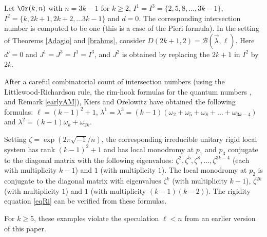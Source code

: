 Let  $\Gr(k,n)$ with $n=3k-1$ for $k\ge2$, $I^1=I^3=\{2,5,8,\dots,3k-1\}$, $I^2=\{k,2k+1,2k+2,\dots 3k-1\}$ and $d=0$. The corresponding intersection number is computed to be one (this is a case of the Pieri formula).  In the setting of Theorems \ref{Adagio} and \ref{brahms}, consider $D(2k+1,2)=\mathcal{B}(\vec{\lambda},\ell)$. Here $d'=0$ and $J^1=J^3=I^1=I^3$, and $J^2$ is obtained by replacing the $2k+1$ in $I^2$ by $2k$.

After a careful combinatorial count of  intersection numbers (using the Littlewood-Richardson rule, the rim-hook formulas for the quantum numbers \cite{BCFF}, and Remark \ref{earlyAM}), Kiers and Orelowitz have obtained the following formulas: $\ell=(k-1)^2+1$,
$\lambda^1=\lambda^3= (k-1)(\omega_2 +\omega_5 + \omega_8+ \dots +\omega_{3k-4})$ and $\lambda^2=(k-1)\omega_{k} +\omega_{2k}$.

Setting $\zeta=\exp(2\pi\sqrt{-1}/n)$, the corresponding irreducible unitary rigid local system has rank $(k-1)^2+1$ and has local monodromy at $p_1$ and $p_3$ conjugate to the diagonal matrix with the following eigenvalues: $\zeta^2,\zeta^5,\zeta^8,\dots, \zeta^{3k-4}$ (each with multiplicity $k-1$) and $1$ (with multiplicity $1$). The local monodromy at $p_2$ is conjugate to the diagonal matrix with eigenvalues $\zeta^k$ (with multiplicity $k-1$), $\zeta^{2k}$ (with multiplicity $1$) and $1$ (with multiplicity $(k-1)(k-2)$).  The rigidity equation  \eqref{eqRi}  can be verified from these formulas.

For $k\ge 5$, these examples violate the speculation $\ell<n$ from an earlier version of this paper.





